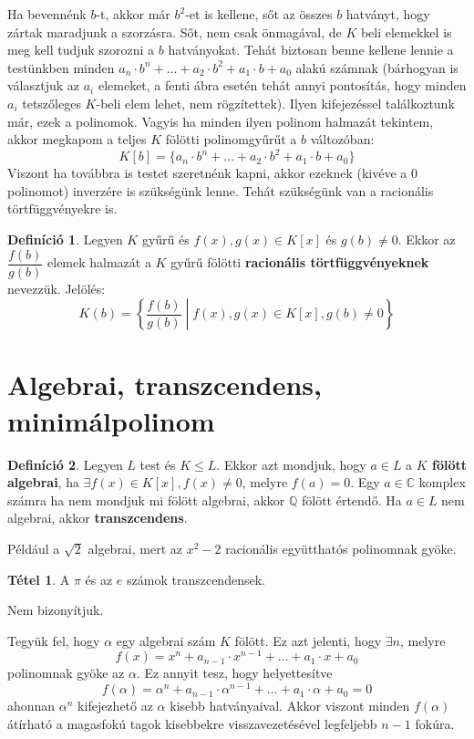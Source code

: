 \documentclass[12pt]{book}
\theoremstyle{plain} %
\theoremstyle{definition} %
\newtheorem{defi/}{Definíció}[section]
\newenvironment{defi}
  {\renewcommand{\qedsymbol}{$\clubsuit$}%
   \pushQED{\qed}\begin{defi/}}
  {\popQED\end{defi/}}
\newtheorem{theo/}{Tétel}[section]
\newenvironment{theo}
  {\renewcommand{\qedsymbol}{$\clubsuit$}%
   \pushQED{\qed}\begin{theo/}}
  {\popQED\end{theo/}}
\theoremstyle{remark}
\renewcommand\qedsymbol{$\blacksquare$}
\numberwithin{equation}{section}  %
\begin{document}
	Ha bevennénk $b$-t, akkor már $b^2$-et is kellene, sőt az összes $b$ hatványt, hogy zártak maradjunk a szorzásra. Sőt, nem csak önmagával, de $K$ beli elemekkel is meg kell tudjuk szorozni a $b$ hatványokat. Tehát biztosan benne kellene lennie a testünkben minden $a_n\cdot b^n+\ldots + a_2\cdot b^2+a_1 \cdot b + a_0$ alakú számnak (bárhogyan is választjuk az $a_i$ elemeket, a fenti ábra esetén tehát annyi pontosítás, hogy minden $a_i$ tetszőleges $K$-beli elem lehet, nem rögzítettek). Ilyen kifejezéssel találkoztunk már, ezek a polinomok. Vagyis ha minden ilyen polinom halmazát tekintem, akkor megkapom a teljes $K$ fölötti polinomgyűrűt a $b$ változóban:
	\[ K[b] = \{a_n\cdot b^n+\ldots + a_2\cdot b^2+a_1 \cdot b + a_0 \}  \]
	Viszont ha továbbra is testet szeretnénk kapni, akkor ezeknek (kivéve a 0 polinomot) inverzére is szükségünk lenne. Tehát szükségünk van a racionális törtfüggvényekre is.
	\begin{defi}
		Legyen $K$ gyűrű és $f(x),g(x)\in K[x]$ és $g(b)\neq 0$. Ekkor az $\dfrac{f(b)}{g(b)}$ elemek halmazát a $K$ gyűrű fölötti \textbf{racionális törtfüggvényeknek} nevezzük. Jelölés:
		\[ K(b) = \left \{ \dfrac{f(b)}{g(b)} \middle | f(x),g(x)\in K[x], g(b)\neq 0 \right \} \]
	\end{defi}
	
	\section{Algebrai, transzcendens, minimálpolinom}
	\begin{defi}
		Legyen $L$ test és $K\leq L$. Ekkor azt mondjuk, hogy $a\in L$ a \textbf{$K$ fölött algebrai}, ha $\exists f(x)\in K[x], f(x)\neq 0$, melyre $f(a)=0$. Egy $a\in \mathbb{C}$ komplex számra ha nem mondjuk mi fölött algebrai, akkor $\mathbb{Q}$ fölött értendő. Ha $a\in L$ nem algebrai, akkor \textbf{transzcendens}.
	\end{defi}
	Például a $\sqrt{2}$ algebrai, mert az $x^2-2$ racionális együtthatós polinomnak gyöke.
	\begin{theo}
		A $\pi$ és az $e$ számok transzcendensek.
	\end{theo}
	Nem bizonyítjuk.
	
	Tegyük fel, hogy $\alpha$ egy algebrai szám $K$ fölött. Ez azt jelenti, hogy $\exists n$, melyre
	\[ f(x)= x^n + a_{n-1} \cdot x^{n-1} + \ldots + a_1\cdot x + a_0  \]
	polinomnak gyöke az $\alpha$. Ez annyit tesz, hogy helyettesítve
	\[ f(\alpha)= \alpha^n + a_{n-1} \cdot \alpha^{n-1} + \ldots + a_1\cdot \alpha + a_0 = 0 \]
	ahonnan $\alpha^n$ kifejezhető az $\alpha$ kisebb hatványaival. Akkor viszont minden $f(\alpha)$ átírható a magasfokú tagok kisebbekre visszavezetésével legfeljebb $n-1$ fokúra.
	
\end{document}
